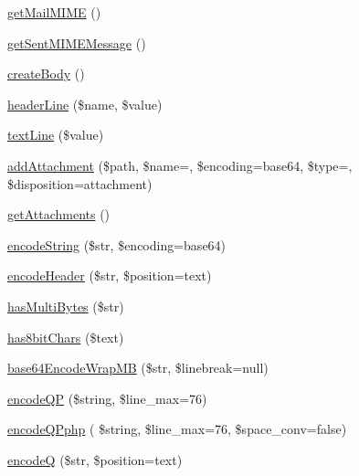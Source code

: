 \begin{DoxyCompactItemize}
\mbox{\hyperlink{class_p_h_p_mailer_a4238784c168132810accd750323bc150}{get\+Mail\+M\+I\+ME}} ()
\item 
\mbox{\hyperlink{class_p_h_p_mailer_aec6ce40e288b3a467d1f02eb4ebcca0d}{get\+Sent\+M\+I\+M\+E\+Message}} ()
\item 
\mbox{\hyperlink{class_p_h_p_mailer_a79754501ca7538d9f9e60706eda37552}{create\+Body}} ()
\item 
\mbox{\hyperlink{class_p_h_p_mailer_acd329ee528ab0cbfdd1d71c38b919335}{header\+Line}} (\$name, \$value)
\item 
\mbox{\hyperlink{class_p_h_p_mailer_aaf78d5e61b23f83805ac61aa1defd2d8}{text\+Line}} (\$value)
\item 
\mbox{\hyperlink{class_p_h_p_mailer_a62bfbe0f5f678aa826c9e15cb2adcfa2}{add\+Attachment}} (\$path, \$name=\textquotesingle{}\textquotesingle{}, \$encoding=\textquotesingle{}base64\textquotesingle{}, \$type=\textquotesingle{}\textquotesingle{}, \$disposition=\textquotesingle{}attachment\textquotesingle{})
\item 
\mbox{\hyperlink{class_p_h_p_mailer_a192498fa150cdee1d2f96ad46530ed68}{get\+Attachments}} ()
\item 
\mbox{\hyperlink{class_p_h_p_mailer_a6c1c0a94e1b5390d10fbf91d585c5c78}{encode\+String}} (\$str, \$encoding=\textquotesingle{}base64\textquotesingle{})
\item 
\mbox{\hyperlink{class_p_h_p_mailer_acc873a724ba707ebb1d7b2da749d1812}{encode\+Header}} (\$str, \$position=\textquotesingle{}text\textquotesingle{})
\item 
\mbox{\hyperlink{class_p_h_p_mailer_ab78b7aaec42fe0f883be15b03dea3f08}{has\+Multi\+Bytes}} (\$str)
\item 
\mbox{\hyperlink{class_p_h_p_mailer_a3dcc28fcd9a275ba846f1dae847a483c}{has8bit\+Chars}} (\$text)
\item 
\mbox{\hyperlink{class_p_h_p_mailer_a6ca640040a05915b0f9e27a39eb4bba9}{base64\+Encode\+Wrap\+MB}} (\$str, \$linebreak=null)
\item 
\mbox{\hyperlink{class_p_h_p_mailer_ab710ab8b22e157c617437783375ad8f3}{encode\+QP}} (\$string, \$line\+\_\+max=76)
\item 
\mbox{\hyperlink{class_p_h_p_mailer_ad067c5c7e93929bf4d0a5d46bc422aef}{encode\+Q\+Pphp}} ( \$string, \$line\+\_\+max=76, \$space\+\_\+conv=false)
\item 
\mbox{\hyperlink{class_p_h_p_mailer_a39354cd9097ebe593153392cb121e223}{encodeQ}} (\$str, \$position=\textquotesingle{}text\textquotesingle{})
\item 

\end{DoxyCompactItemize}
